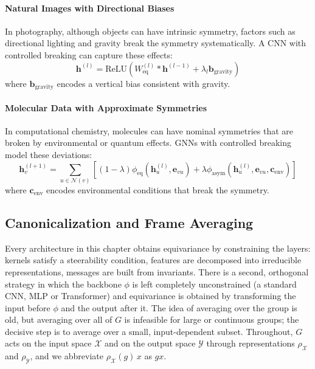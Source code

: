 \paragraph{Natural Images with Directional Biases}

In photography, although objects can have intrinsic symmetry, factors such as directional lighting and gravity break the symmetry systematically. A CNN with controlled breaking can capture these effects:
\begin{equation}
\mathbf{h}^{(l)} = \text{ReLU}(W_{\text{eq}}^{(l)} * \mathbf{h}^{(l-1)} + \lambda_l \mathbf{b}_{\text{gravity}})
\end{equation}
where $\mathbf{b}_{\text{gravity}}$ encodes a vertical bias consistent with gravity.

\paragraph{Molecular Data with Approximate Symmetries}

In computational chemistry, molecules can have nominal symmetries that are broken by environmental or quantum effects. GNNs with controlled breaking model these deviations:
\begin{equation}
\mathbf{h}_v^{(l+1)} = \sum_{u \in \mathcal{N}(v)} [(1-\lambda) \phi_{\text{eq}}(\mathbf{h}_u^{(l)}, \mathbf{e}_{vu}) + \lambda \phi_{\text{asym}}(\mathbf{h}_u^{(l)}, \mathbf{e}_{vu}, \mathbf{c}_{\text{env}})]
\end{equation}
where $\mathbf{c}_{\text{env}}$ encodes environmental conditions that break the symmetry.

\subsection{Canonicalization and Frame Averaging}\label{subsec:canonicalizacion_frames}

Every architecture in this chapter obtains equivariance by constraining the layers: kernels satisfy a steerability condition, features are decomposed into irreducible representations, messages are built from invariants. There is a second, orthogonal strategy in which the backbone $\phi$ is left completely unconstrained (a standard \gls{CNN}, \gls{MLP} or \gls{Transformer}) and equivariance is obtained by transforming the input before $\phi$ and the output after it. The idea of averaging over the group is old, but averaging over all of $G$ is infeasible for large or continuous groups; the decisive step is to average over a small, input-dependent subset. Throughout, $G$ acts on the input space $\mathcal{X}$ and on the output space $\mathcal{Y}$ through representations $\rho_{\mathcal{X}}$ and $\rho_{\mathcal{Y}}$, and we abbreviate $\rho_{\mathcal{X}}(g)\,x$ as $gx$.

